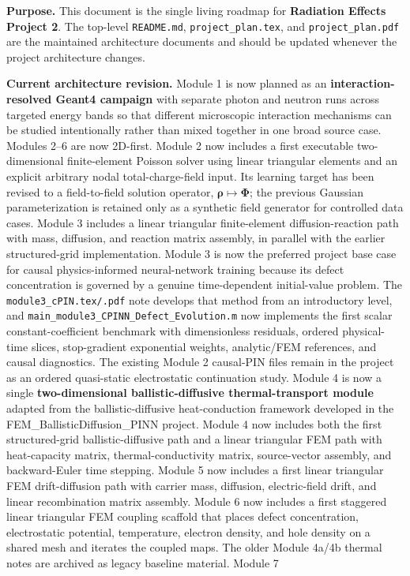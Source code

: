 \documentclass[11pt]{article}
\begin{document}

\begin{keybox}
\textbf{Purpose.} This document is the single living roadmap for \textbf{Radiation Effects Project 2}. The top-level \texttt{README.md}, \texttt{project\_plan.tex}, and \texttt{project\_plan.pdf} are the maintained architecture documents and should be updated whenever the project architecture changes.
\end{keybox}

\ProjectTOC

\begin{notebox}
\textbf{Current architecture revision.} Module 1 is now planned as an \textbf{interaction-resolved Geant4 campaign} with separate photon and neutron runs across targeted energy bands so that different microscopic interaction mechanisms can be studied intentionally rather than mixed together in one broad source case. Modules 2--6 are now 2D-first. Module 2 now includes a first executable two-dimensional finite-element Poisson solver using linear triangular elements and an explicit arbitrary nodal total-charge-field input. Its learning target has been revised to a field-to-field solution operator, $\bm{\rho}\mapsto\bm{\Phi}$; the previous Gaussian parameterization is retained only as a synthetic field generator for controlled data cases. Module 3 includes a linear triangular finite-element diffusion-reaction path with mass, diffusion, and reaction matrix assembly, in parallel with the earlier structured-grid implementation. Module 3 is now the preferred project base case for causal physics-informed neural-network training because its defect concentration is governed by a genuine time-dependent initial-value problem. The \texttt{module3\_cPIN.tex/.pdf} note develops that method from an introductory level, and \texttt{main\_module3\_CPINN\_Defect\_Evolution.m} now implements the first scalar constant-coefficient benchmark with dimensionless residuals, ordered physical-time slices, stop-gradient exponential weights, analytic/FEM references, and causal diagnostics. The existing Module 2 causal-PIN files remain in the project as an ordered quasi-static electrostatic continuation study. Module 4 is now a single \textbf{two-dimensional ballistic-diffusive thermal-transport module} adapted from the ballistic-diffusive heat-conduction framework developed in the FEM\_BallisticDiffusion\_PINN project. Module 4 now includes both the first structured-grid ballistic-diffusive path and a linear triangular FEM path with heat-capacity matrix, thermal-conductivity matrix, source-vector assembly, and backward-Euler time stepping. Module 5 now includes a first linear triangular FEM drift-diffusion path with carrier mass, diffusion, electric-field drift, and linear recombination matrix assembly. Module 6 now includes a first staggered linear triangular FEM coupling scaffold that places defect concentration, electrostatic potential, temperature, electron density, and hole density on a shared mesh and iterates the coupled maps. The older Module 4a/4b thermal notes are archived as legacy baseline material. Module 7 
\end{notebox}
\end{document}
